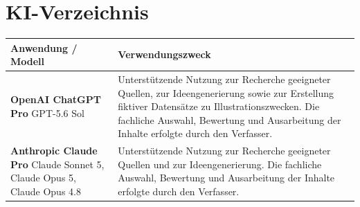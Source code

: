 \documentclass[german,12pt,oneside,titlepage,listof=totoc,bibliography=totoc]{scrartcl}
\begin{document}
	\renewcommand{\lstlistingname}{Quelltext}
	\renewcommand{\lstlistlistingname}{\lstlistingname e}
	\renewcommand{\figurename}{Abbildung}
	\renewcommand{\refname}{Literaturverzeichnis}
	
	\newpage
	\restoregeometry
	\setcounter{page}{2}

	\tableofcontents
	\newpage

	\printnomenclature
	\newpage

	\listoffigures
	\newpage
	
	\listoftables
	\newpage
	

	\chead[\pagemark]{\pagemark}
	\setcounter{page}{1}
		
	\newpage
	\printbibliography[nottype=online,heading=bibintoc,title={Literaturverzeichnis}]

	\newpage

	\section*{KI-Verzeichnis}

	\begin{tabularx}{\textwidth}{p{4.2cm} X}
	\textbf{Anwendung / Modell} & \textbf{Verwendungszweck} \\ \hline

	\textbf{OpenAI ChatGPT Pro} \newline
	GPT-5.6 Sol
	&
	Unterstützende Nutzung zur Recherche geeigneter Quellen, zur Ideengenerierung sowie zur Erstellung fiktiver Datensätze zu Illustrationszwecken. Die fachliche Auswahl, Bewertung und Ausarbeitung der Inhalte erfolgte durch den Verfasser.
	\\[1.2em]

	\textbf{Anthropic Claude Pro} \newline
	Claude Sonnet 5, Claude Opus 5, Claude Opus 4.8
	&
	Unterstützende Nutzung zur Recherche geeigneter Quellen und zur Ideengenerierung. Die fachliche Auswahl, Bewertung und Ausarbeitung der Inhalte erfolgte durch den Verfasser.
	\\

	\end{tabularx}

	\newpage
		
	
\end{document}
